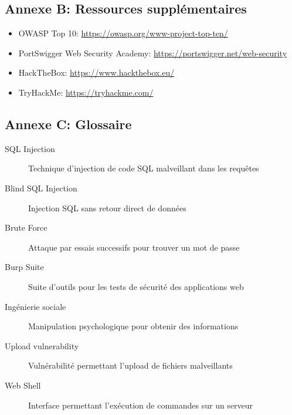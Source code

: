 \documentclass[12pt,a4paper]{article}
\begin{document}
\subsection*{Annexe B: Ressources supplémentaires}

\begin{itemize}
    \item OWASP Top 10: \url{https://owasp.org/www-project-top-ten/}
    \item PortSwigger Web Security Academy: \url{https://portswigger.net/web-security}
    \item HackTheBox: \url{https://www.hackthebox.eu/}
    \item TryHackMe: \url{https://tryhackme.com/}
\end{itemize}

\subsection*{Annexe C: Glossaire}

\begin{description}
    \item[SQL Injection] Technique d'injection de code SQL malveillant dans les requêtes
    \item[Blind SQL Injection] Injection SQL sans retour direct de données
    \item[Brute Force] Attaque par essais successifs pour trouver un mot de passe
    \item[Burp Suite] Suite d'outils pour les tests de sécurité des applications web
    \item[Ingénierie sociale] Manipulation psychologique pour obtenir des informations
    \item[Upload vulnerability] Vulnérabilité permettant l'upload de fichiers malveillants
    \item[Web Shell] Interface permettant l'exécution de commandes sur un serveur
\end{description}
\end{document}

